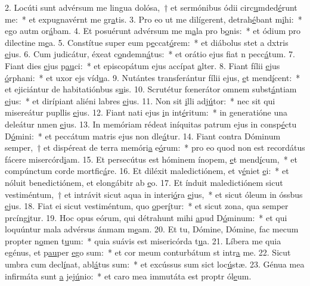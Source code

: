 2. Locúti sunt advérsum me lingua dolósa,~† et sermónibus ódii circ\uline{u}mded\uline{é}runt me:~* et expugnavérnt me gr\uline{a}tis.
3. Pro eo ut me dilígerent, detrah\uline{é}bant m\uline{i}hi:~* ego autm or\uline{á}bam.
4. Et posuérunt advérsum me m\uline{a}la pro b\uline{o}nis:~* et ódium pro dilectine m\uline{e}a.
5. Constítue super eum p\uline{e}ccat\uline{ó}rem:~* et diábolus stet a dxtris \uline{e}jus.
6. Cum judicátur, éxeat c\uline{o}ndemn\uline{á}tus:~* et orátio ejus fiat n pecc\uline{á}tum.
7. Fiant dies \uline{e}jus p\uline{au}ci:~* et episcopátum ejus accípat \uline{a}lter.
8. Fiant fílii \uline{e}jus \uline{ó}rphani:~* et uxor ejs víd\uline{u}a.
9. Nutántes transferántur fílii ejus, \uline{e}t mend\uline{í}cent:~* et ejiciántur de habitatiónbus s\uline{u}is.
10. Scrutétur fœnerátor omnem subst\uline{á}ntiam \uline{e}jus:~* et dirípiant aliéni labres \uline{e}jus.
11. Non sit \uline{i}lli adj\uline{ú}tor:~* nec sit qui misereátur pupllis \uline{e}jus.
12. Fiant nati ejus \uline{i}n int\uline{é}ritum:~* in generatióne una deleátur nmen \uline{e}jus.
13. In memóriam rédeat iníquitas patrum ejus in consp\uline{é}ctu D\uline{ó}mini:~* et peccátum matris ejus non dle\uline{á}tur.
14. Fiant contra Dóminum semper,~† et dispéreat de terra memóri\uline{a} e\uline{ó}rum:~* pro eo quod non est recordátus fácere misercórd\uline{i}am.
15. Et persecútus est hóminem ínopem, \uline{e}t mend\uline{í}cum,~* et compúnctum corde mortfic\uline{á}re.
16. Et diléxit maledictiónem, et v\uline{é}niet \uline{e}i:~* et nóluit benedictiónem, et elongábitr ab \uline{e}o.
17. Et índuit maledictiónem sicut vestiméntum,~† et intrávit sicut aqua in interi\uline{ó}ra \uline{e}jus,~* et sicut óleum in óssbus \uline{e}jus.
18. Fiat ei sicut vestiméntum, quo \uline{o}per\uline{í}tur:~* et sicut zona, qua semper prcíng\uline{i}tur.
19. Hoc opus eórum, qui détrahunt mihi \uline{a}pud D\uline{ó}minum:~* et qui loquúntur mala advérsus ánmam m\uline{e}am.
20. Et tu, Dómine, Dómine, fac mecum propter n\uline{o}men t\uline{u}um:~* quia suávis est misericórda t\uline{u}a.
21. Líbera me quia egénus, et p\uline{au}per \uline{e}go sum:~* et cor meum conturbátum st intr\uline{a} me.
22. Sicut umbra cum decl\uline{í}nat, abl\uline{á}tus sum:~* et excússus sum sict loc\uline{ú}stæ.
23. Génua mea infirmáta sunt \uline{a} jej\uline{ú}nio:~* et caro mea immutáta est proptr ól\uline{e}um.
